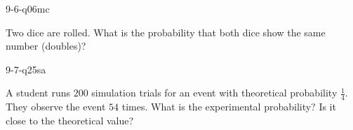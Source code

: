 \begin{practiceQuestion}{9-6-q06}{mc}
\begin{questionText}
Two dice are rolled. What is the probability that both dice show the same number (doubles)?
\end{questionText}
\end{practiceQuestion}

\begin{practiceQuestion}{9-7-q25}{sa}
\begin{questionText}
A student runs $200$ simulation trials for an event with theoretical probability $\frac{1}{4}$. They observe the event $54$ times. What is the experimental probability? Is it close to the theoretical value?
\end{questionText}
\end{practiceQuestion}
